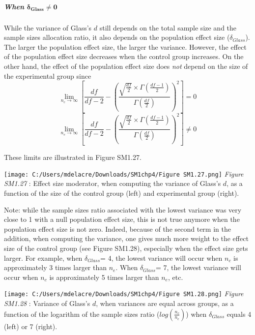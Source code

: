 \documentclass[
  english,
  man,mask,floatsintext]{apa6}
\let\oldsubparagraph\subparagraph
\renewcommand{\subparagraph}[1]{\oldsubparagraph{#1}\mbox{}}
\begin{document}
\hypertarget{when-bmdelta_glass-neq-0}{%
\subparagraph{\texorpdfstring{When \(\bm{\delta_{Glass} \neq 0}\)}{When \textbackslash bm\{\textbackslash delta\_\{Glass\} \textbackslash neq 0\}}}\label{when-bmdelta_glass-neq-0}}

While the variance of Glass's \(d\) still depends on the total sample size and the sample sizes allocation ratio, it also depends on the population effect size (\(\delta_{Glass}\)). The larger the population effect size, the larger the variance. However, the effect of the population effect size decreases when the control group increases. On the other hand, the effect of the population effect size does \emph{not} depend on the size of the experimental group since\\
\[\lim_{n_c\rightarrow \infty}\left[\frac{df}{df-2} - \left( \frac{\sqrt{\frac{df}{2}} \times \Gamma \left(\frac{df-1}{2} \right)}{\Gamma \left( \frac{df}{2}\right)}\right)^2 \right]=0\]
\[\lim_{n_e\rightarrow \infty}\left[\frac{df}{df-2} - \left( \frac{\sqrt{\frac{df}{2}} \times \Gamma \left(\frac{df-1}{2} \right)}{\Gamma \left( \frac{df}{2}\right)}\right)^2 \right] \neq 0\]

These limits are illustrated in Figure SM1.27.

\texttt{[image: C:/Users/mdelacre/Downloads/SM1chp4/Figure SM1.27.png]}
\emph{Figure SM1.27} : Effect size moderator, when computing the variance of Glass's \(d\), as a function of the size of the control group (left) and experimental group (right).

Note: while the sample sizes ratio associated with the lowest variance was very close to 1 with a null population effect size, this is not true anymore when the population effect size is not zero. Indeed, because of the second term in the addition, when computing the variance, one gives much more weight to the effect size of the control group (see Figure SM1.28), especially when the effect size gets larger. For example, when \(\delta_{Glass}\)= 4, the lowest variance will occur when \(n_c\) is approximately 3 times larger than \(n_e\). When \(\delta_{Glass}\)= 7, the lowest variance will occur when \(n_c\) is approximately 5 times larger than \(n_e\), etc.

\texttt{[image: C:/Users/mdelacre/Downloads/SM1chp4/Figure SM1.28.png]}
\emph{Figure SM1.28} : Variance of Glass's \(d\), when variances are equal across groups, as a function of the logarithm of the sample sizes ratio (\(log\left(\frac{n_c}{n_e} \right)\)) when \(\delta_{Glass}\) equals 4 (left) or 7 (right).
\end{document}
